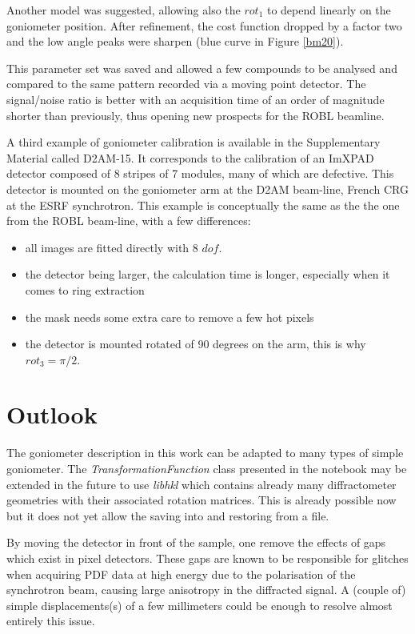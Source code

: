 \documentclass[preprint]{iucr}              %
\begin{document}
Another model was suggested, allowing also the $rot_1$ to depend linearly on the
goniometer position. 
After refinement, the cost function dropped by a factor two and
the low angle peaks were sharpen (blue curve in Figure \ref{bm20}). 

This parameter set was saved and allowed a few compounds to be analysed and
compared to the same pattern recorded via a moving point detector. 
The signal/noise ratio is better with an acquisition time of an order
of magnitude shorter than previously, thus opening new prospects for
the ROBL beamline.

A third example of goniometer calibration is available in the Supplementary
Material called D2AM-15. It corresponds to the calibration of an ImXPAD detector
composed of 8 stripes of 7 modules, many of which are defective.
This detector is mounted on the goniometer arm at the D2AM beam-line, French CRG
at the ESRF synchrotron. 
This example is conceptually the same as the the one from the ROBL beam-line,
with a few differences:
\begin{itemize}
  \item all images are fitted directly with 8 $dof$.
  \item the detector being larger, the calculation time is
        longer, especially when it comes to ring extraction
  \item the mask needs some extra care to remove a few hot pixels
  \item the detector is mounted rotated of 90 degrees on the arm, this is why
  $rot_3=\pi/2$.
\end{itemize}

\section{Outlook}

The goniometer description in this work can be adapted to
many types of simple goniometer.
The \textit{TransformationFunction} class presented in the notebook may be extended
in the future to use \textit{libhkl} \cite{libhkl} which contains already many
diffractometer geometries with their associated rotation matrices. 
This is already possible now but it does not yet allow the saving into and
restoring from a file. 

By moving the detector in front of the sample, one remove the effects of
gaps which exist in pixel detectors.
These gaps are known to be responsible for glitches
when acquiring PDF data at high energy due to the
polarisation of the synchrotron beam, causing large anisotropy in the
diffracted signal. 
A (couple of) simple displacements(s) of a few millimeters could be enough
to resolve almost entirely this issue.
\end{document}
